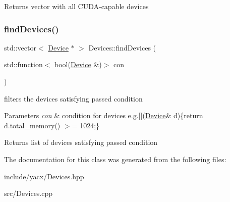 \begin{DoxyReturn}{Returns}
vector with all C\+U\+D\+A-\/capable devices 
\end{DoxyReturn}
\mbox{\label{classyacx_1_1_devices_a274f530c0b46a7fcdd13d36b55330541}} 
\subsubsection{\texorpdfstring{find\+Devices()}{findDevices()}\hspace{0.1cm}{\footnotesize\ttfamily [2/2]}}
{\footnotesize\ttfamily std\+::vector$<$ \hyperlink{classyacx_1_1_device}{Device} $\ast$ $>$ Devices\+::find\+Devices (\begin{DoxyParamCaption}\item[{std\+::function$<$ bool(\hyperlink{classyacx_1_1_device}{Device} \&)$>$}]{con }\end{DoxyParamCaption})\hspace{0.3cm}{\ttfamily [static]}}

filters the devices satisfying passed condition 
\begin{DoxyParams}{Parameters}
{\em con} & condition for devices e.\+g.\textquotesingle{}\mbox{[}\mbox{]}(\hyperlink{classyacx_1_1_device}{Device}\& d)\{return d.\+total\+\_\+memory() $>$= 1024;\}\textquotesingle{} \\
\hline
\end{DoxyParams}
\begin{DoxyReturn}{Returns}
list of devices satisfying passed condition 
\end{DoxyReturn}


The documentation for this class was generated from the following files\+:\begin{DoxyCompactItemize}
\item 
include/yacx/Devices.\+hpp\item 
src/Devices.\+cpp\end{DoxyCompactItemize}
